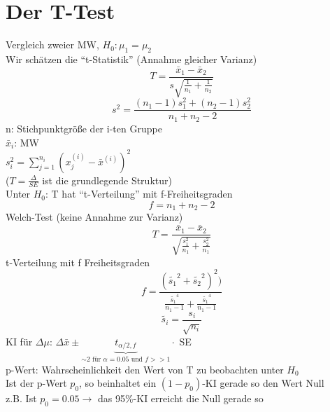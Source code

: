 \documentclass[10pt]{report}
\theoremstyle{definition}
\begin{document}
\section{Der T-Test}
Vergleich zweier MW, $H_0: \mu_1 = \mu_2$ \\
Wir schätzen die ``t-Statistik'' (Annahme gleicher Varianz) \\
\[ T = \frac{\bar{x}_1 - \bar{x}_2}{s \sqrt{\frac{1}{n_1} + \frac{1}{n_2}}} \]
\[ s^2 = \frac{(n_1 - 1) s_1^2 + (n_2 -1) s_2^2}{n_1 + n_2 -2} \]
n: Stichpunktgröße der i-ten Gruppe \\
$\bar{x}_i$: MW \\
$s_i^2 = \sum\limits_{j=1}^{n_i} (x_j^{(i)} - \bar{x}^{(i)} )^2 $ \\
($T = \frac{\Delta}{SE}$ ist die grundlegende Struktur) \\
Unter $H_0$: T hat ``t-Verteilung'' mit f-Freiheitsgraden
\[ f= n_1 + n_2 -2 \]
Welch-Test (keine Annahme zur Varianz) \\
\[ T = \frac{\bar{x}_1 - \bar{x}_2 }{\sqrt{\frac{s_1^2}{n_1} + \frac{s_2^2}{n_1}}} \]
t-Verteilung mit f Freiheitsgraden
\[ f=\frac{(\tilde{s_1}^2 + \tilde{s_2}^2)^2)}{\frac{\tilde{s_1}^4}{n_1 - 1} + \frac{\tilde{s_1}^4}{n_1 - 1}} \]
\[ \tilde{s_i} = \frac{s_i}{\sqrt{n_i}} \]
KI für $\Delta \mu$: $\Delta \bar{x} \pm \underbrace{t_{\alpha / 2 , f}}_{\sim 2 \text{ für } \alpha=0.05 \text{ und } f >> 1}  \cdot$ SE \\
p-Wert: Wahrscheinlichkeit den Wert von T zu beobachten unter $H_0$ \\
Ist der p-Wert $p_0$, so beinhaltet ein $(1-p_0)$-KI gerade so den Wert Null \\
z.B. Ist $p_0=0.05 \rightarrow$ das 95\%-KI erreicht die Null gerade so
\end{document}
